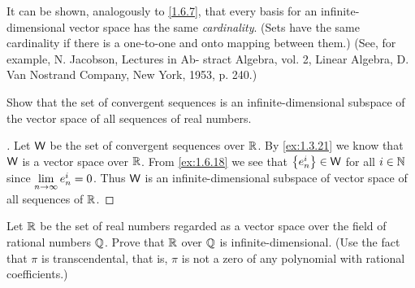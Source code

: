 \begin{note}
  It can be shown, analogously to \cref{1.6.7}, that every basis for an infinite-dimensional vector space has the same \emph{cardinality}.
  (Sets have the same cardinality if there is a one-to-one and onto mapping between them.)
  (See, for example, N. Jacobson, Lectures in Ab- stract Algebra, vol. 2, Linear Algebra, D. Van Nostrand Company, New York, 1953, p. 240.)
\end{note}

\exercisesection

\setcounter{ex}{1}
\begin{ex}\label{ex:1.7.2}
  Show that the set of convergent sequences is an infinite-dimensional subspace of the vector space of all sequences of real numbers.
\end{ex}

\begin{proof}[]
  Let \(\mathsf{W}\) be the set of convergent sequences over \(\mathbb{R}\).
  By \cref{ex:1.3.21} we know that \(\mathsf{W}\) is a vector space over \(\mathbb{R}\).
  From \cref{ex:1.6.18} we see that \(\left\lbrace e_n^i\right\rbrace \in \mathsf{W}\) for all \(i \in \mathbb{N}\) since \(\lim\limits_{n \to \infty} e_n^i = 0\).
  Thus \(\mathsf{W}\) is an infinite-dimensional subspace of vector space of all sequences of \(\mathbb{R}\).
\end{proof}

\begin{ex}\label{ex:1.7.3}
  Let \(\mathbb{R}\) be the set of real numbers regarded as a vector space over the field of rational numbers \(\mathbb{Q}\).
  Prove that \(\mathbb{R}\) over \(\mathbb{Q}\) is infinite-dimensional.
  (Use the fact that \(\pi\) is transcendental, that is, \(\pi\) is not a zero of any polynomial with rational coefficients.)
\end{ex}

